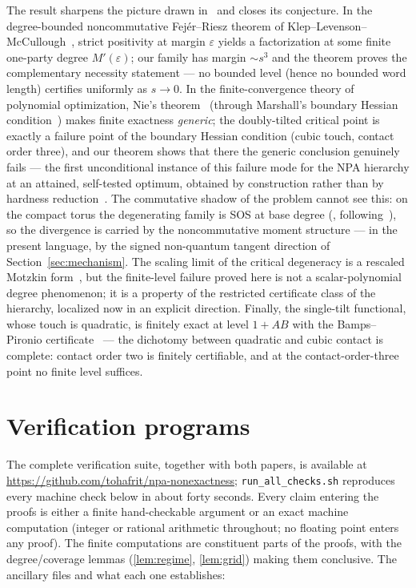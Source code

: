 \documentclass[11pt]{article}
\newcommand{\eps}{\varepsilon}
\begin{document}
The result sharpens the picture drawn in~\cite{overshoot} and closes its
conjecture. In the degree-bounded noncommutative Fej\'er--Riesz theorem
of Klep--Levenson--McCullough~\cite{KLM}, strict positivity at margin
$\eps$ yields a factorization at some finite one-party degree
$M'(\eps)$; our family has margin $\sim s^3$ and the theorem proves the
complementary necessity statement --- no bounded level (hence no bounded
word length) certifies uniformly as $s\to0$. In the finite-convergence
theory of polynomial optimization, Nie's theorem~\cite{Nie} (through
Marshall's boundary Hessian condition~\cite{Marshall}) makes finite
exactness \emph{generic}; the doubly-tilted critical point is exactly a
failure point of the boundary Hessian condition (cubic touch, contact
order three), and our theorem shows that there the generic conclusion
genuinely fails --- the first unconditional instance of this failure mode
for the NPA hierarchy at an attained, self-tested optimum, obtained by
construction rather than by hardness reduction~\cite{hardness}. The
commutative shadow of the problem cannot see this: on the compact torus
the degenerating family is SOS at base degree
(\cite{overshoot}, following~\cite{Dritschel,Scheiderer}), so the
divergence is carried by the noncommutative moment structure --- in the
present language, by the signed non-quantum tangent direction of
Section~\ref{sec:mechanism}. The scaling limit of the critical
degeneracy is a rescaled Motzkin form~\cite{overshoot}, but the
finite-level failure proved here is not a scalar-polynomial degree
phenomenon; it is a property of the restricted certificate class of the
hierarchy, localized now in an explicit direction. Finally, the
single-tilt functional, whose touch is quadratic, is finitely exact at
level $1{+}AB$ with the Bamps--Pironio certificate~\cite{BampsPironio}
--- the dichotomy between quadratic and cubic contact is complete: contact
order two is finitely certifiable, and at the contact-order-three point
no finite level suffices.

\appendix

\section{Verification programs}\label{app:verif}

The complete verification suite, together with both papers, is available at
\url{https://github.com/tohafrit/npa-nonexactness}; \texttt{run\_all\_checks.sh}
reproduces every machine check below in about forty seconds. Every claim
entering the proofs is either a finite hand-checkable
argument or an exact machine computation (integer or rational arithmetic
throughout; no floating point enters any proof). The finite computations
are constituent parts of the proofs, with the degree/coverage lemmas
(\ref{lem:regime}, \ref{lem:grid}) making them conclusive. The ancillary
files and what each one establishes:
\end{document}
